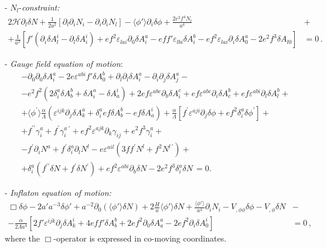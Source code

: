 \noindent - $N_l$-\textit{constraint:}
\begin{align}
2 \mathcal{H} \partial_l \delta N + \frac{1}{2 a^2} \left[ \partial_l \partial_i N_i - \partial_i \partial_i N_l \right] -\langle\phi'\rangle \partial_i \delta \phi  + \frac{ 2 e^2 f^4  N_l } {a^4} & + \nonumber \\
+ \frac{1}{a^2} \left[  f' \left( \partial_i \delta A^i_{l} -  \partial_l \delta A^i_{i} \right) + e f^2 \varepsilon_{lai} \partial_0 \delta A^a_{i} - e f f' \varepsilon_{lbi} \delta A^b_{i} - e f^2  \varepsilon_{lai} \partial_i \delta A^a_{0} - 2 e^2 f^3 \delta A_{l0}  \right] & = 0 \,.
\end{align}

\noindent - \textit{Gauge field equation of motion}:
\begin{align}
& -\partial_0 \partial_0 \delta A^a_i - 2 e \varepsilon^{abi} f' \delta A^b_0 + \partial_l \partial_l \delta A^a_i - \partial_i \partial_j \delta A^a_j - \nonumber \\
& - e^2 f^2 (2 \delta^a_i \delta A^b_b  +  \delta A^a_i -\delta A^i_a  ) + 2 e f \varepsilon^{abc} \partial_b \delta A^c_i + e f \varepsilon^{abc} \partial_i \delta A^b_c + e f \varepsilon^{abi} \partial_l \delta A^b_l + \nonumber \\
& + \langle \phi^\prime \rangle  \frac{\alpha}{\Lambda}  \left( \varepsilon^{ijk}  \partial_j \delta A^a_k +  \delta^a_i e f \delta A^b_b - ef \delta A^i_a \right)  + \frac{\alpha}{\Lambda} \left[  f^\prime \varepsilon^{aji}\partial_j \delta \phi  + e f^2 \delta^a_i \delta \phi^\prime  \right] + \nonumber \\
& + f^{\prime \prime} \gamma^{a}_i + f^{\prime} \gamma^{a \ \prime}_i + e f^2  \varepsilon^{ajk} \partial_k \gamma_{ij} + e^2 f^3 \gamma^a_{i} + \nonumber \\ 
& - f^{\prime } \partial_i  N^a +  f^{\prime } \delta^a_i \partial_l  N^l - e \varepsilon^{ail} (3 f f^{\prime} N^l + f^2 N^{l \, \prime} ) + \nonumber \\
& + \delta^a_i (f^{\prime \prime} \delta N + f^{\prime } \delta N^\prime ) + e f^2 \varepsilon^{abi} \partial_b \delta N - 2 e^2 f^3 \delta^a_i \delta N \,  = 0 . 
\end{align}

\noindent - \textit{Inflaton equation of motion:}
\begin{align}
\Box \delta \phi - 2 a' a^{-3} \delta \phi' + a^{-2} \partial_0( \langle \phi' \rangle \delta N) +  2 \frac{H}{a} \langle \phi' \rangle \delta N  + \frac{\langle \phi' \rangle}{a^4} \partial_i N_i - V_{,\phi \phi} \delta \phi - V_{, \phi} \delta N & - \nonumber \\
- \frac{\alpha}{2 \Lambda a^4} \left[ 2 f' \varepsilon^{ijk} \partial_j \delta A^i_k + 4 e f f' \delta A^b_b + 2 e f^2 \partial_0 \delta A^a_a - 2 e f^2 \partial_i \delta A^i_0 \right] & = 0 \, ,
\end{align}
where the $\Box$-operator is expressed in co-moving coordinates.

